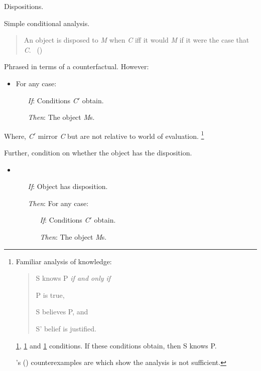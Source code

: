 \begin{note}
  Dispositions.

  Simple conditional analysis.

  \begin{quote}
    An object is disposed to \emph{M} when \emph{C} iff it would \emph{M} if it were the case that \emph{C}.\newline
    \mbox{ }\hfill\mbox{(\citeauthor[\S1.2]{Choi:2021wg})}
  \end{quote}

  Phrased in terms of a counterfactual.
  However:
  \begin{itemize}
  \item
    For any case:
    \begin{itemize}
    \item[\emph{If}:]
      Conditions \emph{C}\('\) obtain.
    \item[\emph{Then}:]
      The object \emph{M}s.
    \end{itemize}
  \end{itemize}

  Where, \emph{C}\('\) mirror \emph{C} but are not relative to world of evaluation.%
  \footnote{
    Familiar analysis of knowledge:

    \begin{quote}
      S knows P \emph{if and only if}
      \begin{enumerate*}[label=\roman*., ref=(\roman*)]
      \item
        \label{K:jtb:t}
        P is true,
      \item
        \label{K:jtb:b}
        S believes P, and
      \item
        \label{K:jtb:j}
        S' belief is justified.
      \end{enumerate*}%
    \end{quote}

    \ref{K:jtb:t}, \ref{K:jtb:b} and \ref{K:jtb:j} conditions.
    If these conditions obtain, then S knows P.

    \citeauthor{Gettier:1963aa}'s (\citeyear{Gettier:1963aa}) counterexamples are  which show the analysis is not sufficient.
  }

  Further, condition on whether the object has the disposition.

  \begin{itemize}
  \item
    \begin{itemize}
    \item[\emph{If}:]
      Object has disposition.
    \item[\emph{Then}:]
      For any case:
      \begin{itemize}
      \item[\emph{If}:]
        Conditions \emph{C}\('\) obtain.
      \item[\emph{Then}:]
        The object \emph{M}s.
      \end{itemize}
    \end{itemize}
  \end{itemize}


\end{note}
